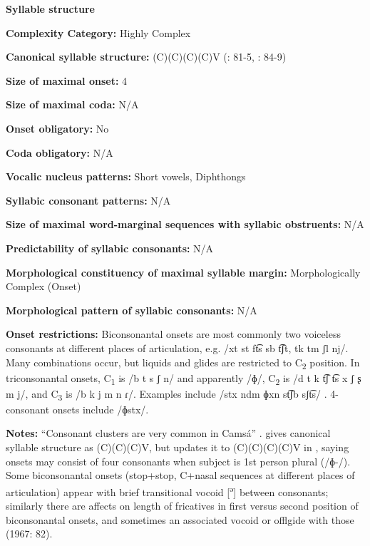 \textbf{Syllable structure}



\textbf{Complexity Category:} Highly Complex



\textbf{Canonical syllable structure:} (C)(C)(C)(C)V (\citealt{Howard1967}: 81-5, \citealt{Howard1972}: 84-9)



\textbf{Size of maximal onset:} 4



\textbf{Size of maximal coda:} N/A



\textbf{Onset obligatory:} No



\textbf{Coda obligatory:} N/A



\textbf{Vocalic nucleus patterns:} Short vowels, Diphthongs



\textbf{Syllabic consonant patterns:} N/A



\textbf{Size of maximal word{}-marginal sequences with syllabic obstruents:} N/A



\textbf{Predictability of syllabic consonants:} N/A



\textbf{Morphological constituency of maximal syllable margin:} Morphologically Complex (Onset)



\textbf{Morphological pattern of syllabic consonants:} N/A



\textbf{Onset restrictions:} Biconsonantal onsets are most commonly two voiceless consonants at different places of articulation, e.g. /xt st ft͡s sb t͡ʃt, tk tm ʃl nj/. Many combinations occur, but liquids and glides are restricted to C\textsubscript{2} position. In triconsonantal onsets, C\textsubscript{1} is /b t s ʃ n/ and apparently /ɸ/, C\textsubscript{2} is /d t k t͡ʃ t͡s x ʃ ʂ m j/, and C\textsubscript{3} is /b k j m n ɾ/. Examples include /stx ndm ɸxn st͡ʃb sʃt͡s/ . 4-consonant onsets include /ɸstx/.



\textbf{Notes:} “Consonant clusters are very common in Camsá” \citep[81]{Howard1967}. \citet{Howard1967} gives canonical syllable structure as (C)(C)(C)V, but updates it to (C)(C)(C)(C)V in \citet{Howard1972}, saying onsets may consist of four consonants when subject is 1st person plural (/ɸ{}-/). Some biconsonantal onsets (stop+stop, C+nasal sequences at different places of articulation) appear with brief transitional vocoid [\textsuperscript{ə}] between consonants; similarly there are affects on length of fricatives in first versus second position of biconsonantal onsets, and sometimes an associated vocoid or offlgide with those (1967: 82).



